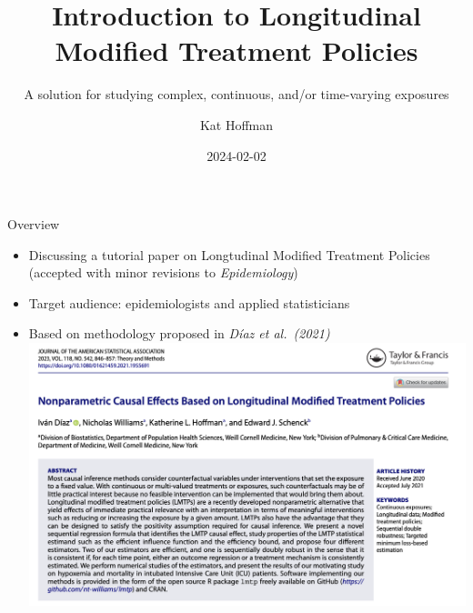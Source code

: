 \documentclass[
  10pt,
  ignorenonframetext,
]{beamer}
\title{Introduction to Longitudinal Modified Treatment Policies}
\subtitle{A solution for studying complex, continuous, and/or
time-varying exposures}
\author{Kat Hoffman}
\date{2024-02-02}
\providecommand{\tightlist}{%
  \setlength{\itemsep}{0pt}\setlength{\parskip}{0pt}}\usepackage{longtable,booktabs,array}
\begin{document}
\frame{\titlepage}
\ifdefined\Shaded\renewenvironment{Shaded}{\begin{tcolorbox}[interior hidden, boxrule=0pt, sharp corners, frame hidden, borderline west={3pt}{0pt}{shadecolor}, enhanced, breakable]}{\end{tcolorbox}}\fi

\begin{frame}{Overview}
\protect\hypertarget{overview}{}
\newcommand{\Pdist}{\mathsf{P}}
\newcommand{\dint}{\mathsf{d}}
\newcommand{\E}{\mathsf{E}}
\newcommand{\Ec}{\mathbb{E}}
\newcommand{\V}{\mathsf{Var}}
\newcommand{\M}{\mathcal{M}}
\newcommand{\1}{\mathbbm{1}}
\newcommand{\pr}{\mathsf{pr}}

\begin{itemize}
\tightlist
\item
  Discussing a tutorial paper on Longtudinal Modified Treatment Policies
  (accepted with minor revisions to \emph{Epidemiology})
\item
  Target audience: epidemiologists and applied statisticians
\item
  Based on methodology proposed in \emph{Díaz et al.~(2021)}
  \includegraphics{img/jasa_ss.png}
\end{itemize}
\end{frame}
\end{document}
